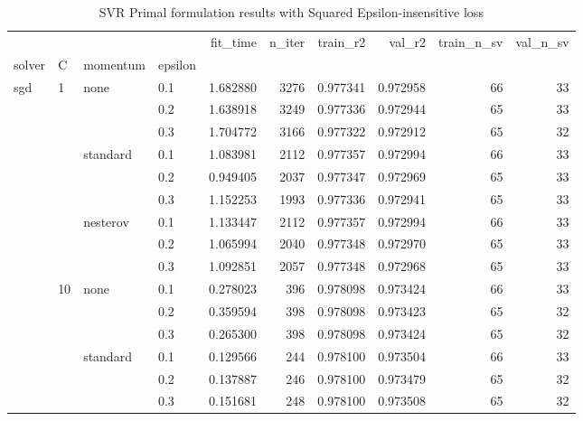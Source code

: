 \begin{table}[H]
\centering
\caption{SVR Primal formulation results with Squared Epsilon-insensitive loss}
\label{primal_svr_squared_eps_cv_results}
\begin{tabular}{llllrrrrrr}
\toprule
          &     &   &     &  fit\_time &  n\_iter &  train\_r2 &    val\_r2 &  train\_n\_sv &  val\_n\_sv \\
solver & C & momentum & epsilon &           &         &           &           &             &           \\
\midrule
sgd & 1   & none & 0.1 &  1.682880 &    3276 &  0.977341 &  0.972958 &          66 &        33 \\
          &     &   & 0.2 &  1.638918 &    3249 &  0.977336 &  0.972944 &          65 &        33 \\
          &     &   & 0.3 &  1.704772 &    3166 &  0.977322 &  0.972912 &          65 &        32 \\
          &     & standard & 0.1 &  1.083981 &    2112 &  0.977357 &  0.972994 &          66 &        33 \\
          &     &   & 0.2 &  0.949405 &    2037 &  0.977347 &  0.972969 &          65 &        33 \\
          &     &   & 0.3 &  1.152253 &    1993 &  0.977336 &  0.972941 &          65 &        33 \\
          &     & nesterov & 0.1 &  1.133447 &    2112 &  0.977357 &  0.972994 &          66 &        33 \\
          &     &   & 0.2 &  1.065994 &    2040 &  0.977348 &  0.972970 &          65 &        33 \\
          &     &   & 0.3 &  1.092851 &    2057 &  0.977348 &  0.972968 &          65 &        33 \\
          & 10  & none & 0.1 &  0.278023 &     396 &  0.978098 &  0.973424 &          66 &        33 \\
          &     &   & 0.2 &  0.359594 &     398 &  0.978098 &  0.973423 &          65 &        32 \\
          &     &   & 0.3 &  0.265300 &     398 &  0.978098 &  0.973424 &          65 &        32 \\
          &     & standard & 0.1 &  0.129566 &     244 &  0.978100 &  0.973504 &          66 &        33 \\
          &     &   & 0.2 &  0.137887 &     246 &  0.978100 &  0.973479 &          65 &        32 \\
          &     &   & 0.3 &  0.151681 &     248 &  0.978100 &  0.973508 &          65 &        32 \\

\end{tabular}
\end{table}
